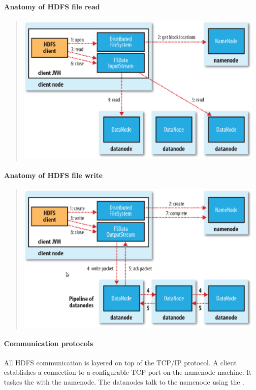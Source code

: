 \documentclass{memo}
\begin{document}
\paragraph{Anatomy of HDFS file read}
\begin{quote}
\includegraphics[scale=0.2]{fread.ps}
\end{quote}

\paragraph{Anatomy of HDFS file write}
\begin{quote}
\includegraphics[scale=0.2]{fwrite.ps}
\end{quote}


\paragraph{Communication protocols}
All HDFS communication is layered on top of the TCP/IP protocol. A client
establishes a connection to a configurable TCP port on the namenode
machine. It taskes the  with the namenode. The datanodes
talk to the namenode using the .  
\end{document}
